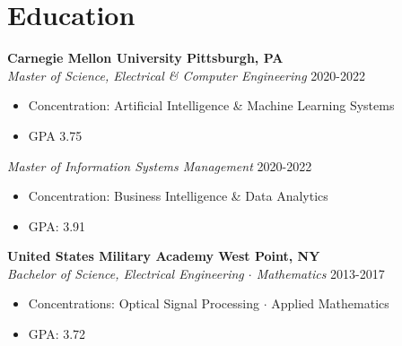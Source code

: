 \documentclass[letterpaper,10pt]{article}
\newenvironment{tightitemize}{%
  \begin{itemize}[
    itemsep=0pt, %
    topsep=0pt, %
    leftmargin=12pt, %
    rightmargin=60pt, %
    parsep=0pt,
    partopsep=0pt,
    label=\scriptsize$\bullet$ %
  ]%
  \footnotesize
}{%
  \end{itemize}
}
\begin{document}
\section{Education}
    \textbf{Carnegie Mellon University  \hfill \textbf{Pittsburgh, PA}} \\
    \hspace*{0.5pt}\textit{Master of Science, Electrical \& Computer Engineering} \hfill 2020\hspace{2pt}-\hspace{2pt}2022 \\
        \vspace{-18pt}
        \begin{tightitemize}
            \item Concentration: Artificial Intelligence \& Machine Learning Systems
            \item GPA 3.75
        \end{tightitemize}
        \vspace{-2pt}
    \hspace*{0.5pt}\textit{Master of Information Systems Management} \hfill 2020\hspace{2pt}-\hspace{2pt}2022 \\
        \vspace{-18pt}
        \begin{tightitemize}
            \item Concentration: Business Intelligence \& Data Analytics
            \item GPA: 3.91
        \end{tightitemize}
        \vspace{-2pt}
    \textbf{United States Military Academy \hfill West Point, NY} \\
    \hspace*{0.5pt}\textit{Bachelor of Science, Electrical Engineering $\cdot$ Mathematics} \hfill 2013\hspace{2pt}-\hspace{2pt}2017 \\
        \vspace{-18pt}
        \begin{tightitemize}
            \item Concentrations: Optical Signal Processing $\cdot$ Applied Mathematics
            \item GPA: 3.72
        \end{tightitemize}
\medskip
\end{document}
